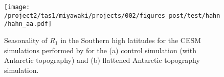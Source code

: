 \documentclass{ametsocV5}
\begin{document}
\begin{figure}[t]
    \noindent\texttt{[image: /project2/tas1/miyawaki/projects/002/figures\_post/test/hahn/hahn\_aa.pdf]}\\
    \caption{Seasonality of $R_1$ in the Southern high latitudes for the CESM simulations performed by \citep{hahn2020} for the (a) control simulation (with Antarctic topography) and (b) flattened Antarctic topography simulation.}
    \label{fig:hahn-aa}
\end{figure}



\end{document}
